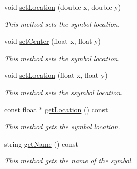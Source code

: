 \begin{DoxyCompactItemize}
void \hyperlink{classbridges_1_1datastructure_1_1_symbol_af76b495d18afdee5d1a6551eceba583b}{set\+Location} (double x, double y)
\begin{DoxyCompactList}\small\item\em This method sets the symbol location. \end{DoxyCompactList}\item 
void \hyperlink{classbridges_1_1datastructure_1_1_symbol_a98a1c3d133e7fe2150d933495e421760}{set\+Center} (float x, float y)
\begin{DoxyCompactList}\small\item\em This method sets the symbol location. \end{DoxyCompactList}\item 
void \hyperlink{classbridges_1_1datastructure_1_1_symbol_a4dbf51dac8b22b293a7061f5eb84b460}{set\+Location} (float x, float y)
\begin{DoxyCompactList}\small\item\em This method sets the ssymbol location. \end{DoxyCompactList}\item 
const float $\ast$ \hyperlink{classbridges_1_1datastructure_1_1_symbol_a6ab847b892f510e185f2aebb9302bc82}{get\+Location} () const
\begin{DoxyCompactList}\small\item\em This method gets the symbol location. \end{DoxyCompactList}\item 
string \hyperlink{classbridges_1_1datastructure_1_1_symbol_a9365f8d91faf67e14ceaa89f8a5d0338}{get\+Name} () const
\begin{DoxyCompactList}\small\item\em This method gets the name of the symbol. \end{DoxyCompactList}\end{DoxyCompactItemize}
